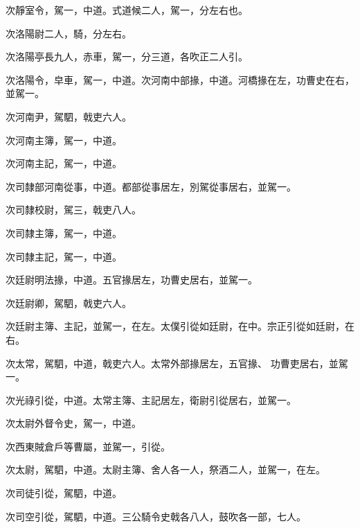 \begin{pinyinscope}
 次靜室令，駕一，中道。式道候二人，駕一，分左右也。



 次洛陽尉二人，騎，分左右。



 次洛陽亭長九人，赤車，駕一，分三道，各吹正二人引。



 次洛陽令，皁車，駕一，中道。次河南中部掾，中道。河橋掾在左，功曹史在右，並駕一。



 次河南尹，駕駟，戟吏六人。



 次河南主簿，駕一，中道。



 次河南主記，駕一，中道。



 次司隸部河南從事，中道。都部從事居左，別駕從事居右，並駕一。



 次司隸校尉，駕三，戟吏八人。



 次司隸主簿，駕一，中道。



 次司隸主記，駕一，中道。



 次廷尉明法掾，中道。五官掾居左，功曹史居右，並駕一。



 次廷尉卿，駕駟，戟吏六人。



 次廷尉主簿、主記，並駕一，在左。太僕引從如廷尉，在中。宗正引從如廷尉，在右。



 次太常，駕駟，中道，戟吏六人。太常外部掾居左，五官掾、
 功曹吏居右，並駕一。



 次光祿引從，中道。太常主簿、主記居左，衛尉引從居右，並駕一。



 次太尉外督令史，駕一，中道。



 次西東賊倉戶等曹屬，並駕一，引從。



 次太尉，駕駟，中道。太尉主簿、舍人各一人，祭酒二人，並駕一，在左。



 次司徒引從，駕駟，中道。



 次司空引從，駕駟，中道。三公騎令史戟各八人，鼓吹各一部，七人。




\end{pinyinscope}
